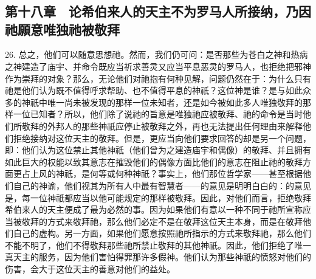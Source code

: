 

\section{}


\subsection{第十八章　论希伯来人的天主不为罗马人所接纳，乃因祂願意唯独祂被敬拜}

26. 总之，他们可以随意思想祂。然而，我们仍可问：是否那些为苍白之神和热病之神建造了庙宇、并命令既应当祈求善灵又应当平息恶灵的罗马人，也拒绝把邪神作为崇拜的对象？那么，无论他们对祂抱有何种见解，问题仍然在于：为什么只有祂是他们认为既不值得呼求帮助、也不值得平息的神祇？这位神是谁？是与如此众多的神祇中唯一尚未被发现的那样一位未知者，还是如今被如此多人唯独敬拜的那样一位已知者？所以，他们除了说祂的旨意是唯独祂应被敬拜、祂的命令是当时他们所敬拜的外邦人的那些神祇应停止被敬拜之外，再也无法提出任何理由来解释他们拒绝接纳对这位天主的敬拜。但是，更应当向他们要求回答的却是另一个问题，即：他们认为这位禁止其他神祇（他们曾为之建造庙宇和偶像）的敬拜、并且拥有如此巨大的权能以致其意志在摧毁他们的偶像方面比他们的意志在阻止祂的敬拜方面更占上风的神祇，是何等或何种神祇？事实上，他们那位哲学家——甚至根据他们自己的神谕，他们视其为所有人中最有智慧者——的意见是明明白白的：的意见是，每一位神祇都应当以他可能规定的那样被敬拜。因此，对他们而言，拒绝敬拜希伯来人的天主便成了最为必然的事。因为如果他们有意以一种不同于祂所宣称应当被敬拜的方式来敬拜祂，那么他们必定不是在敬拜这位天主本身，而是在敬拜他们自己的虚构。另一方面，如果他们愿意按照祂所指示的方式来敬拜祂，那么他们不能不明了，他们不得敬拜那些祂所禁止敬拜的其他神祇。因此，他们拒绝了唯一真天主的服务，因为他们害怕得罪那许多假神。他们认为那些神祇的愤怒对他们的伤害，会大于这位天主的善意对他们的益处。\par


